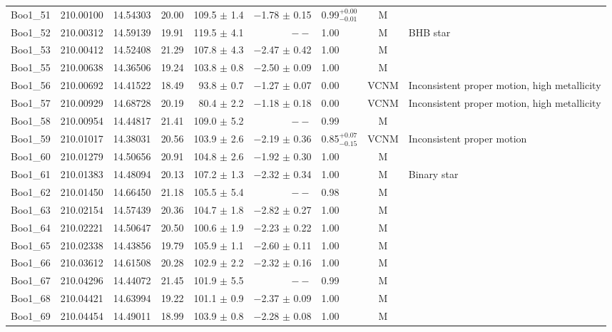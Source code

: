 \begin{table*}[t]
\begin{tabular}{lllrrrlcl}
Boo1\_51 & 210.00100 & 14.54303 & 20.00 & 109.5  $\pm$ 1.4 & $-$1.78  $\pm$ 0.15 & 0.99$^{+0.00}_{-0.01}$ & M & \\ 
Boo1\_52 & 210.00312 & 14.59139 & 19.91 & 119.5  $\pm$ 4.1 & $--$  & 1.00 & M & BHB star\\ 
Boo1\_53 & 210.00412 & 14.52408 & 21.29 & 107.8  $\pm$ 4.3 & $-$2.47  $\pm$ 0.42 & 1.00 & M & \\ 
Boo1\_55 & 210.00638 & 14.36506 & 19.24 & 103.8  $\pm$ 0.8 & $-$2.50  $\pm$ 0.09 & 1.00 & M & \\ 
Boo1\_56 & 210.00692 & 14.41522 & 18.49 & 93.8  $\pm$ 0.7 & $-$1.27  $\pm$ 0.07 & 0.00 & VCNM & Inconsistent proper motion, high metallicity\\ 
Boo1\_57 & 210.00929 & 14.68728 & 20.19 & 80.4  $\pm$ 2.2 & $-$1.18  $\pm$ 0.18 & 0.00 & VCNM & Inconsistent proper motion, high metallicity\\ 
Boo1\_58 & 210.00954 & 14.44817 & 21.41 & 109.0  $\pm$ 5.2 & $--$  & 0.99 & M & \\ 
Boo1\_59 & 210.01017 & 14.38031 & 20.56 & 103.9  $\pm$ 2.6 & $-$2.19  $\pm$ 0.36 & 0.85$^{+0.07}_{-0.15}$ & VCNM & Inconsistent proper motion\\ 
Boo1\_60 & 210.01279 & 14.50656 & 20.91 & 104.8  $\pm$ 2.6 & $-$1.92  $\pm$ 0.30 & 1.00 & M & \\ 
Boo1\_61 & 210.01383 & 14.48094 & 20.13 & 107.2  $\pm$ 1.3 & $-$2.32  $\pm$ 0.34 & 1.00 & M & Binary star\\ 
Boo1\_62 & 210.01450 & 14.66450 & 21.18 & 105.5  $\pm$ 5.4 & $--$  & 0.98 & M & \\ 
Boo1\_63 & 210.02154 & 14.57439 & 20.36 & 104.7  $\pm$ 1.8 & $-$2.82  $\pm$ 0.27 & 1.00 & M & \\ 
Boo1\_64 & 210.02221 & 14.50647 & 20.50 & 100.6  $\pm$ 1.9 & $-$2.23  $\pm$ 0.22 & 1.00 & M & \\ 
Boo1\_65 & 210.02338 & 14.43856 & 19.79 & 105.9  $\pm$ 1.1 & $-$2.60  $\pm$ 0.11 & 1.00 & M & \\ 
Boo1\_66 & 210.03612 & 14.61508 & 20.28 & 102.9  $\pm$ 2.2 & $-$2.32  $\pm$ 0.16 & 1.00 & M & \\ 
Boo1\_67 & 210.04296 & 14.44072 & 21.45 & 101.9  $\pm$ 5.5 & $--$  & 0.99 & M & \\ 
Boo1\_68 & 210.04421 & 14.63994 & 19.22 & 101.1  $\pm$ 0.9 & $-$2.37  $\pm$ 0.09 & 1.00 & M & \\ 
Boo1\_69 & 210.04454 & 14.49011 & 18.99 & 103.9  $\pm$ 0.8 & $-$2.28  $\pm$ 0.08 & 1.00 & M & \\ 

\end{tabular}
\end{table*}
